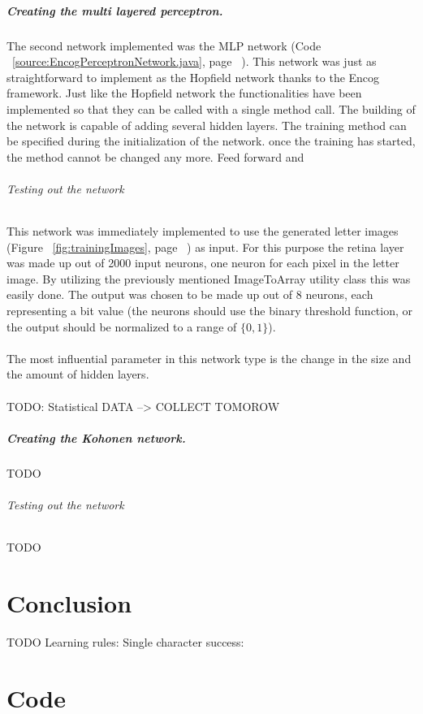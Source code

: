 \documentclass[pdftex,a4paper,12pt,twoside]{report}
\theoremstyle{plain} \newtheorem{theorem}{Theorem} \newtheorem{proposition}{Proposition} \newtheorem{lemma}{Lemma} \newtheorem*{corollary}{Corollary}
\theoremstyle{definition} \newtheorem{definition}{Definition} \newtheorem{conjecture}{Conjecture} \newtheorem*{example}{Example} \newtheorem{algorithm}{Algorithm}
\theoremstyle{remark} \newtheorem*{remark}{Remark} \newtheorem*{note}{Note} \newtheorem{case}{Case}
\begin{document}
\paragraph{Creating the multi layered perceptron.}
The second network implemented was the MLP network (Code ~\ref{source:EncogPerceptronNetwork.java}, page ~\pageref{source:EncogPerceptronNetwork.java}). This network was just as straightforward to implement as the Hopfield network thanks to the Encog framework. Just like the Hopfield network the functionalities have been implemented so that they can be called with a single method call. The building of the network is capable of adding several hidden layers. The training method can be specified during the initialization of the network. once the training has started, the method cannot be changed any more.
Feed forward\citep{Jiang2003} and \citep{Browning2007}
\subparagraph{Testing out the network}
This network was immediately implemented to use the generated letter images (Figure ~\ref{fig:trainingImages}, page ~\pageref{fig:trainingImages}) as input. For this purpose the retina layer was made up out of 2000 input neurons, one neuron for each pixel in the letter image. By utilizing the previously mentioned ImageToArray utility class this was easily done. The output was chosen to be made up out of 8 neurons, each representing a bit value (the neurons should use the binary threshold function, or the output should be normalized to a range of $\{0,1\}$).\\\\The most influential parameter in this network type is the change in the size and the amount of hidden layers.
\\\\
TODO: Statistical DATA --> COLLECT TOMOROW
\paragraph{Creating the Kohonen network.}
TODO
\citep{Torma1995}
\subparagraph{Testing out the network}
TODO
\chapter{Conclusion}
\label{ch:conclusie}
TODO
Learning rules: \citep{SathasivamSaratha2011}
Single character success: \citep{Chellapilla2005}
%
%
\appendix
\chapter*{Code}
\label{ch:Sourcecode}
\end{document}
